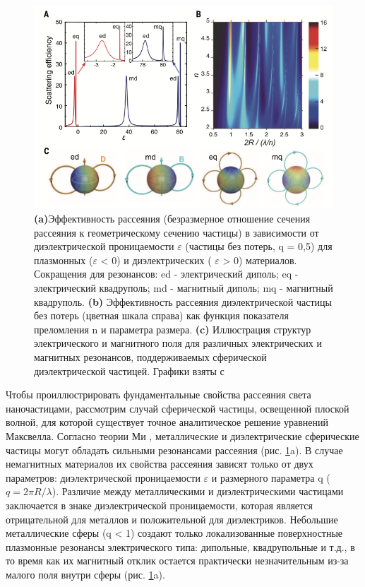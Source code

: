 \begin{figure}[h!]
	\centering
	\includegraphics[width=0.7\linewidth]{images/fig1.png}
	\caption{\textbf{(a)}Эффективность рассеяния (безразмерное отношение сечения рассеяния к геометрическому сечению частицы) в зависимости от диэлектрической проницаемости $\varepsilon$ (частицы без потерь, q = 0,5) для плазмонных ($\varepsilon$  < 0) и диэлектрических ( $\varepsilon$ > 0) материалов. Сокращения для резонансов: ed - электрический диполь; eq - электрический квадруполь; md - магнитный диполь; mq - магнитный квадруполь. \textbf{(b)} Эффективность рассеяния диэлектрической частицы без потерь (цветная шкала справа) как функция показателя преломления n и параметра размера. \textbf{(c)} Иллюстрация структур электрического и магнитного поля для различных электрических и магнитных резонансов, поддерживаемых сферической диэлектрической частицей. Графики взяты с \cite{kuznetsov2016optically}}
	\label{fig1}
\end{figure}
\hspace*{2mm}
Чтобы проиллюстрировать фундаментальные свойства рассеяния света наночастицами, рассмотрим случай сферической частицы, освещенной плоской волной, для которой существует точное аналитическое решение уравнений Максвелла. Согласно теории Ми \cite{absorbScattLight}, металлические и диэлектрические сферические частицы могут обладать сильными резонансами рассеяния (рис. \ref{fig1}a). В случае немагнитных материалов их свойства рассеяния зависят только от двух параметров: диэлектрической проницаемости $\varepsilon$  и размерного параметра q ($q = 2\pi R/\lambda$). Различие между металлическими и диэлектрическими частицами заключается в знаке диэлектрической проницаемости, которая является отрицательной для металлов и положительной для диэлектриков. Небольшие металлические сферы (q < 1) создают только локализованные поверхностные плазмонные резонансы электрического типа:  дипольные, квадрупольные и т.д., в то время как их магнитный отклик остается практически незначительным из-за малого поля внутри сферы (рис. \ref{fig1}a).  
